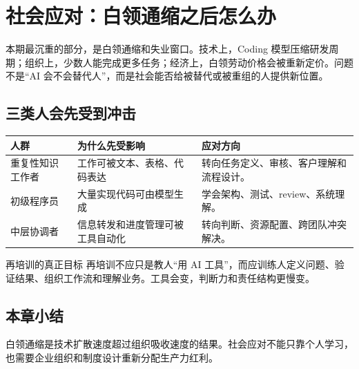 \section{社会应对：白领通缩之后怎么办}

本期最沉重的部分，是白领通缩和失业窗口。技术上，Coding 模型压缩研发周期；组织上，少数人能完成更多任务；经济上，白领劳动价格会被重新定价。问题不是“AI 会不会替代人”，而是社会能否给被替代或被重组的人提供新位置。

\subsection{三类人会先受到冲击}

\noindent\begin{tabularx}{\textwidth}{p{}p{}X}
\toprule
人群 & 为什么先受影响 & 应对方向 \\
\midrule
重复性知识工作者 & 工作可被文本、表格、代码表达 & 转向任务定义、审核、客户理解和流程设计。 \\
初级程序员 & 大量实现代码可由模型生成 & 学会架构、测试、review、系统理解。 \\
中层协调者 & 信息转发和进度管理可被工具自动化 & 转向判断、资源配置、跨团队冲突解决。 \\
\bottomrule
\end{tabularx}

\begin{knowledgebox}{再培训的真正目标}
再培训不应只是教人“用 AI 工具”，而应训练人定义问题、验证结果、组织工作流和理解业务。工具会变，判断力和责任结构更慢变。
\end{knowledgebox}

\subsection{本章小结}

白领通缩是技术扩散速度超过组织吸收速度的结果。社会应对不能只靠个人学习，也需要企业组织和制度设计重新分配生产力红利。


